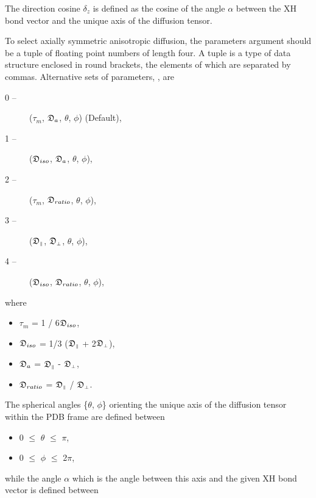 The direction cosine $\delta_z$ is defined as the cosine of the angle $\alpha$ between the XH bond vector and the unique axis of the diffusion tensor.


To select axially symmetric anisotropic diffusion, the parameters argument should be a tuple of floating point numbers of length four.  A tuple is a type of data structure enclosed in round brackets, the elements of which are separated by commas.  Alternative sets of parameters, , are


\begin{description}
\item[0 --]  ($\tau_m$, $\mathfrak{D}_a$, $\theta$, $\phi$)   (Default), 
\item[1 --]  ($\mathfrak{D}_{iso}$, $\mathfrak{D}_a$, $\theta$, $\phi$), 
\item[2 --]  ($\tau_m$, $\mathfrak{D}_{ratio}$, $\theta$, $\phi$), 
\item[3 --]  ($\mathfrak{D}_{\scriptscriptstyle \parallel}$, $\mathfrak{D}_{\scriptscriptstyle \perp}$, $\theta$, $\phi$), 
\item[4 --]  ($\mathfrak{D}_{iso}$, $\mathfrak{D}_{ratio}$, $\theta$, $\phi$), 
\end{description}


where


\begin{itemize}
\item[] $\tau_m$ = 1 / 6$\mathfrak{D}_{iso}$, 
\item[] $\mathfrak{D}_{iso}$ = 1/3 ($\mathfrak{D}_{\scriptscriptstyle \parallel}$ + 2$\mathfrak{D}_{\scriptscriptstyle \perp}$), 
\item[] $\mathfrak{D}_a$ = $\mathfrak{D}_{\scriptscriptstyle \parallel}$ - $\mathfrak{D}_{\scriptscriptstyle \perp}$, 
\item[] $\mathfrak{D}_{ratio}$ = $\mathfrak{D}_{\scriptscriptstyle \parallel}$ / $\mathfrak{D}_{\scriptscriptstyle \perp}$. 
\end{itemize}


The spherical angles \{$\theta$, $\phi$\} orienting the unique axis of the diffusion tensor within the PDB frame are defined between


\begin{itemize}
\item[] 0 $\le$ $\theta$ $\le$ $\pi$, 
\item[] 0 $\le$ $\phi$ $\le$ 2$\pi$, 
\end{itemize}


while the angle $\alpha$ which is the angle between this axis and the given XH bond vector is defined between


